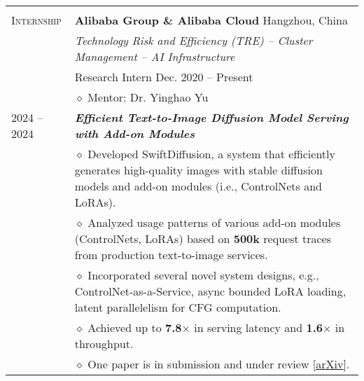 \documentclass[letterpaper, 12pt]{article}
\begin{document}
\begin{longtable}{p{1.0in}p{5.8in}}
& \\


\nohyphens{\textsc{Internship}}
& \textbf{Alibaba Group \& Alibaba Cloud} \hfill Hangzhou, China \\
& \textit{Technology Risk and Efficiency (TRE) -- Cluster Management -- AI Infrastructure} \\
& Research Intern \hfill Dec. 2020 -- Present \\
& $\diamond$ Mentor: Dr. Yinghao Yu \\

2024 -- 2024
& \textbf{\emph{Efficient Text-to-Image Diffusion Model Serving with Add-on Modules}} \\
    & $\diamond$ Developed SwiftDiffusion, a system that efficiently generates high-quality images with stable diffusion models and add-on modules (i.e., ControlNets and LoRAs). \\
    & $\diamond$ Analyzed usage patterns of various add-on modules (ControlNets, LoRAs) based on \textbf{500k} request traces from production text-to-image services. \\
    & $\diamond$ Incorporated several novel system designs, e.g., ControlNet-as-a-Service, async bounded LoRA loading, latent parallelelism for CFG computation. \\
    & $\diamond$ Achieved up to \textbf{7.8$\times$} in serving latency and \textbf{1.6$\times$} in throughput. \\
    & $\diamond$ One paper is in submission and under review [\href{https://arxiv.org/abs/2407.02031}{\underline{arXiv}}]. \\


\end{longtable}
\end{document}
